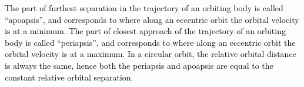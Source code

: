 \documentclass[main.tex]{subfiles}
\begin{document}
\begin{tcolorbox}[sharp corners, colback=red!30, colframe=red!80!blue, title=Periapsis and apoapsis$^5$]
\par \textcolor{black} { The part of furthest separation in the trajectory of an orbiting body is called ``apoapsis'', and corresponds to where along an eccentric orbit the orbital velocity is at a minimum. The part of closest approach of the trajectory of an orbiting body is called ``periapsis'', and corresponds to where along an eccentric orbit the orbital velocity is at a maximum. In a circular orbit, the relative orbital distance is always the same, hence both the periapsis and apoapsis are equal to the constant relative orbital separation. }
\end{tcolorbox}
\end{document}
